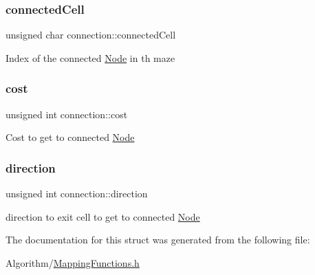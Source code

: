\subsubsection{\texorpdfstring{connected\+Cell}{connectedCell}}
{\footnotesize\ttfamily unsigned char connection\+::connected\+Cell}

Index of the connected \hyperlink{structNode}{Node} in th maze \mbox{\label{structconnection_a41c58f8db339b3e05c9d459170128eb3}} 
\subsubsection{\texorpdfstring{cost}{cost}}
{\footnotesize\ttfamily unsigned int connection\+::cost}

Cost to get to connected \hyperlink{structNode}{Node} \mbox{\label{structconnection_a8e2347a2c150b409cbfea1cbd02c031b}} 
\subsubsection{\texorpdfstring{direction}{direction}}
{\footnotesize\ttfamily unsigned int connection\+::direction}

direction to exit cell to get to connected \hyperlink{structNode}{Node} 

The documentation for this struct was generated from the following file\+:\begin{DoxyCompactItemize}
\item 
Algorithm/\hyperlink{MappingFunctions_8h}{Mapping\+Functions.\+h}\end{DoxyCompactItemize}
